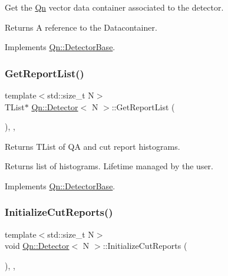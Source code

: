 Get the \mbox{\hyperlink{namespaceQn}{Qn}} vector data container associated to the detector. 

\begin{DoxyReturn}{Returns}
A reference to the Datacontainer. 
\end{DoxyReturn}


Implements \mbox{\hyperlink{classQn_1_1DetectorBase}{Qn\+::\+Detector\+Base}}.

\mbox{\label{classQn_1_1Detector_a88a7d5c31a81624f9918c75220ffdd8a}} 
\subsubsection{\texorpdfstring{Get\+Report\+List()}{GetReportList()}}
{\footnotesize\ttfamily template$<$std\+::size\+\_\+t N$>$ \\
T\+List$\ast$ \mbox{\hyperlink{classQn_1_1Detector}{Qn\+::\+Detector}}$<$ N $>$\+::Get\+Report\+List (\begin{DoxyParamCaption}{ }\end{DoxyParamCaption})\hspace{0.3cm}{\ttfamily [inline]}, {\ttfamily [override]}, {\ttfamily [virtual]}}



Returns T\+List of QA and cut report histograms. 

\begin{DoxyReturn}{Returns}
list of histograms. Lifetime managed by the user. 
\end{DoxyReturn}


Implements \mbox{\hyperlink{classQn_1_1DetectorBase}{Qn\+::\+Detector\+Base}}.

\mbox{\label{classQn_1_1Detector_a0dba51a9ca021046bdfa9c7af262b3f7}} 
\subsubsection{\texorpdfstring{Initialize\+Cut\+Reports()}{InitializeCutReports()}}
{\footnotesize\ttfamily template$<$std\+::size\+\_\+t N$>$ \\
void \mbox{\hyperlink{classQn_1_1Detector}{Qn\+::\+Detector}}$<$ N $>$\+::Initialize\+Cut\+Reports (\begin{DoxyParamCaption}{ }\end{DoxyParamCaption})\hspace{0.3cm}{\ttfamily [inline]}, {\ttfamily [override]}, {\ttfamily [virtual]}}

